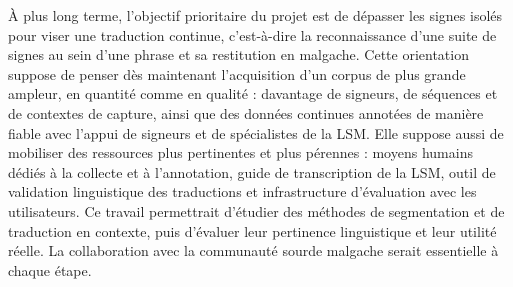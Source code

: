 À plus long terme, l'objectif prioritaire du projet est de dépasser les signes isolés pour viser une traduction continue, c'est-à-dire la reconnaissance d'une suite de signes au sein d'une phrase et sa restitution en malgache. Cette orientation suppose de penser dès maintenant l'acquisition d'un corpus de plus grande ampleur, en quantité comme en qualité : davantage de signeurs, de séquences et de contextes de capture, ainsi que des données continues annotées de manière fiable avec l'appui de signeurs et de spécialistes de la LSM. Elle suppose aussi de mobiliser des ressources plus pertinentes et plus pérennes : moyens humains dédiés à la collecte et à l'annotation, guide de transcription de la LSM, outil de validation linguistique des traductions et infrastructure d'évaluation avec les utilisateurs. Ce travail permettrait d'étudier des méthodes de segmentation et de traduction en contexte, puis d'évaluer leur pertinence linguistique et leur utilité réelle. La collaboration avec la communauté sourde malgache serait essentielle à chaque étape.

\endinput
